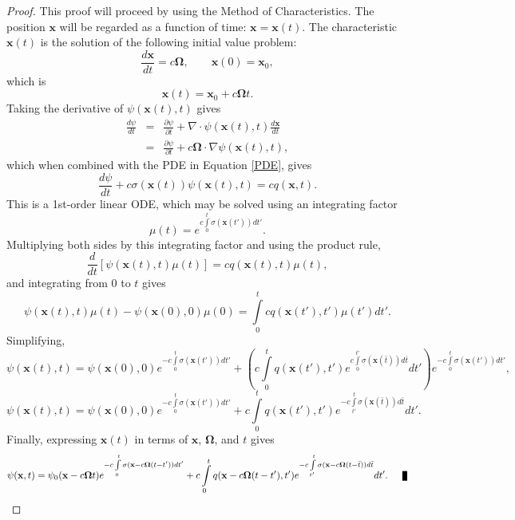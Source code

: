 \begin{proof}
   This proof will proceed by using the Method of Characteristics. The position
   $\mathbf{x}$ will be regarded as a function of time: $\mathbf{x}=\mathbf{x}(t)$.
   The characteristic $\mathbf{x}(t)$ is the solution of the following initial value problem:
   \[
      \frac{d\mathbf{x}}{dt} = c\mathbf{\Omega},\qquad \mathbf{x}(0) = \mathbf{x}_0,
   \]
   which is
   \[
      \mathbf{x}(t) = \mathbf{x}_0 + c\mathbf{\Omega}t.
   \]
   Taking the derivative of $\psi(\mathbf{x}(t),t)$ gives
   \begin{eqnarray*}
      \frac{d\psi}{dt} & = &\frac{\partial\psi}{\partial t} +
      \nabla\cdot\psi(\mathbf{x}(t),t) \frac{d\mathbf{x}}{dt}\\
      & = &\frac{\partial \psi}{\partial t} +
      c\mathbf{\Omega}\cdot\nabla\psi(\mathbf{x}(t),t),
   \end{eqnarray*}
   which when combined with the PDE in Equation \eqref{PDE}, gives
   \[
      \frac{d\psi}{dt} + c\sigma(\mathbf{x}(t))\psi(\mathbf{x}(t),t) = c q(\mathbf{x},t).
   \]
   This is a 1st-order linear ODE, which may be solved using an integrating factor
   \[
      \mu(t)=e^{c\int\limits_0^t\sigma(\mathbf{x}(t'))dt'}.
   \]
   Multiplying both sides by this integrating factor and using the product rule,
   \[
      \frac{d}{dt}\left[\psi(\mathbf{x}(t),t)\mu(t)\right] = c q(\mathbf{x}(t),t) \mu(t),
   \]
   and integrating from $0$ to $t$ gives
   \[
      \psi(\mathbf{x}(t),t)\mu(t)-\psi(\mathbf{x}(0),0)\mu(0) =
         \int\limits_0^t c q(\mathbf{x}(t'),t') \mu(t') dt'.
   \]
   Simplifying,
   \[
      \psi(\mathbf{x}(t),t) = \psi(\mathbf{x}(0),0)
         e^{-c\int\limits_0^t \sigma(\mathbf{x}(t'))dt'} +
         \left(c \int\limits_0^t q(\mathbf{x}(t'),t')
         e^{c\int\limits_0^{t'}\sigma(\mathbf{x}(\bar{t}))d\bar{t}} dt'\right)
         e^{-c\int\limits_0^t\sigma(\mathbf{x}(t'))dt'},
   \]
   \[
      \psi(\mathbf{x}(t),t) = \psi(\mathbf{x}(0),0)
         e^{-c\int\limits_0^t \sigma(\mathbf{x}(t'))dt'} +
         c \int\limits_0^t q(\mathbf{x}(t'),t')
         e^{-c\int\limits_{t'}^t\sigma(\mathbf{x}(\bar{t}))d\bar{t}} dt'.
   \]
   Finally, expressing $\mathbf{x}(t)$ in terms of $\mathbf{x}$, $\mathbf{\Omega}$,
   and $t$ gives
   \[
      \psi(\mathbf{x},t) = \psi_0(\mathbf{x} - c\mathbf{\Omega}t)
         e^{-c\int\limits_0^t \sigma(\mathbf{x} - c\mathbf{\Omega}(t -t'))dt'} +
         c \int\limits_0^t q(\mathbf{x} - c\mathbf{\Omega}(t -t'),t')
         e^{-c\int\limits_{t'}^t\sigma(\mathbf{x}
         - c\mathbf{\Omega}(t -\bar{t}))d\bar{t}} dt'.\qed
   \]
\end{proof}
